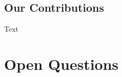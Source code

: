 \subsection{Our Contributions}\label{comm-ssec:contributions}
Text

\clearpage


\section{Open Questions}
\label{comm-sec:conclusions}

\clearpage






